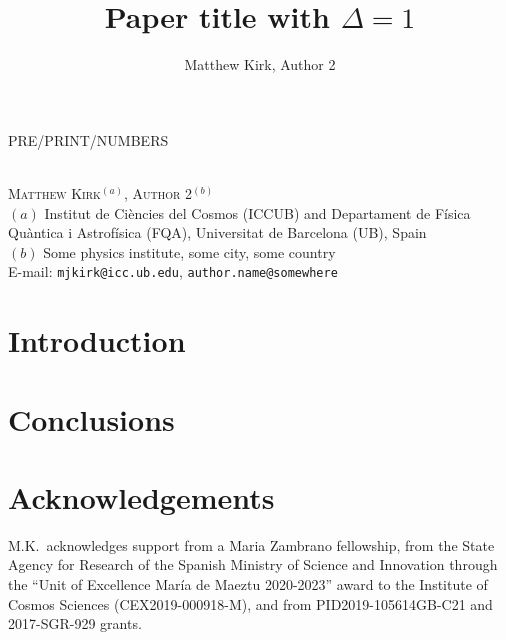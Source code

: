 \documentclass[a4paper,11pt]{article}
\author{Matthew Kirk, Author 2}
\title{Paper title with \texorpdfstring{$\Delta = 1$}{Delta = 1}}
\numberwithin{equation}{section} %
\begin{document}
\begin{flushright}
PRE/PRINT/NUMBERS
\end{flushright}

\begin{center}
\vspace*{1cm}
{\LARGE\bfseries
\makeatletter\@title\makeatother
}
\\[0.8 cm]
\textsc{
Matthew Kirk$^{(a)}$, Author 2$^{(b)}$
}
\\[0.5 cm]
{\small
$(a)$ Institut de Ciències del Cosmos (ICCUB) and Departament de Física Quàntica i Astrofísica (FQA), Universitat de Barcelona (UB), Spain
\\[0.2cm]
$(b)$ Some physics institute, some city, some country
\\[0.5 cm]
E-mail:
\texttt{mjkirk@icc.ub.edu},
\texttt{author.name@somewhere}
}
\end{center}

\vskip1.5cm

\renewcommand{\abstractname}{\Large\bfseries Abstract}

\begin{abstract}
\end{abstract}

{\small \tableofcontents}

\section{Introduction}
\label{sec:intro}

\section{Conclusions}
\label{sec:conclusions}

\section*{Acknowledgements}
M.K.\ acknowledges support from a Maria Zambrano fellowship, from the State Agency for Research of the Spanish Ministry of Science and Innovation through the ``Unit of Excellence María de Maeztu 2020-2023'' award to the Institute of Cosmos Sciences (CEX2019-000918-M), and from PID2019-105614GB-C21 and 2017-SGR-929 grants.



\end{document}
